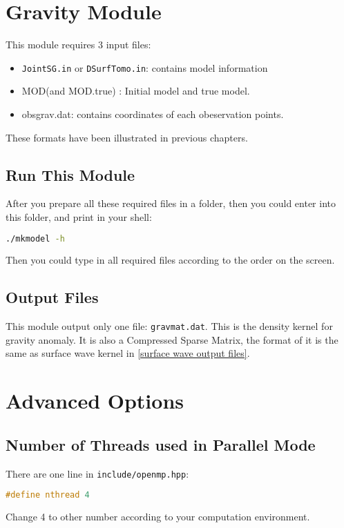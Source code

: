 \documentclass[UTF8]{article}
\begin{document}
    \section{Gravity Module}
    This module requires 3 input files:
    \begin{itemize}
        \item \verb!JointSG.in! or \verb!DSurfTomo.in!: contains model information
        \item MOD(and MOD.true) : Initial model and true model.
        \item obsgrav.dat: contains coordinates of each obeservation points.
    \end{itemize}
    These formats have been illustrated in previous chapters.

    \subsection{Run This Module}
    After you prepare all these required files in a folder, then you could enter into this folder,
    and print in your shell:
    \begin{lstlisting}[language=bash]
    ./mkmodel -h
    \end{lstlisting}
    Then you could type in all required files according to the order on the screen.

    \subsection{Output Files}
    This module output only one file: \verb!gravmat.dat!. This is the density kernel 
    for gravity anomaly. It is also a Compressed Sparse Matrix, the format of it is the 
    same as surface wave kernel in \ref{surface wave output files}.

    \section{Advanced Options}
    \subsection{Number of Threads used in Parallel Mode}\label{number of threads}
    There are one line in \verb!include/openmp.hpp!:
    \begin{lstlisting}[language=c++]
    #define nthread 4
    \end{lstlisting}
    Change 4 to other number according to your computation environment.
\end{document}
